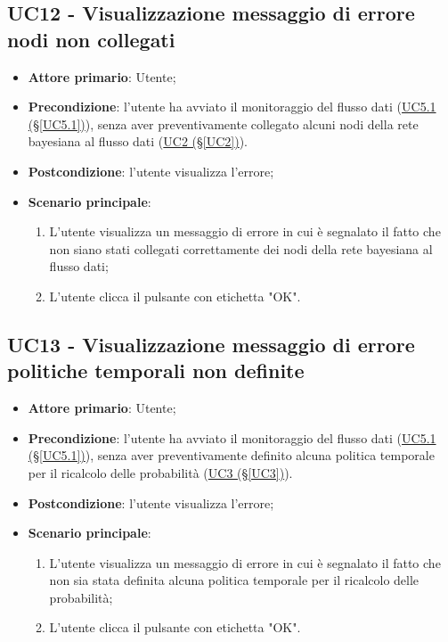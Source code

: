 \pagebreak

\subsection{UC12 - Visualizzazione messaggio di errore nodi non collegati}\label{UC12}
\begin{itemize}
\item \textbf{Attore primario}: Utente;
\item \textbf{Precondizione}: l'utente ha avviato il monitoraggio del flusso dati (\hyperref[UC5.1]{UC5.1 							(§\ref*{UC5.1})}), senza aver preventivamente collegato alcuni nodi della rete bayesiana al flusso dati 							(\hyperref[UC2]{UC2 (§\ref*{UC2})}).
\item \textbf{Postcondizione}: l'utente visualizza l'errore;
\item \textbf{Scenario principale}: 
	\begin{enumerate}
	\item L'utente visualizza un messaggio di errore in cui è segnalato il fatto che non siano stati collegati 						correttamente dei nodi della rete bayesiana al flusso dati;
	\item L'utente clicca il pulsante con etichetta "OK".
	\end{enumerate}
\end{itemize}

\pagebreak

\subsection{UC13 - Visualizzazione messaggio di errore politiche temporali non definite}\label{UC13}
\begin{itemize}
\item \textbf{Attore primario}: Utente;
\item \textbf{Precondizione}: l'utente ha avviato il monitoraggio del flusso dati (\hyperref[UC5.1]{UC5.1 							(§\ref*{UC5.1})}), senza aver preventivamente definito alcuna politica temporale per il ricalcolo delle 							probabilità (\hyperref[UC3]{UC3 (§\ref*{UC3})}).
\item \textbf{Postcondizione}: l'utente visualizza l'errore;
\item \textbf{Scenario principale}: 
	\begin{enumerate}
	\item L'utente visualizza un messaggio di errore in cui è segnalato il fatto che non sia stata definita alcuna 				politica temporale per il ricalcolo delle probabilità;
	\item L'utente clicca il pulsante con etichetta "OK".
	\end{enumerate}
\end{itemize}

